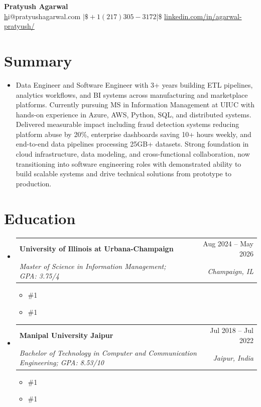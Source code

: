 \documentclass[letterpaper,11pt]{article}
\makeatletter
\newcommand{\resumeSubheading}[4]{
  \vspace{0pt}\item
    \begin{tabular*}{\textwidth}{l@{\extracolsep{\fill}}r}
      \textbf{#1} & #2 \\
      \textit{#3} & \textit{#4} \\ 
    \end{tabular*}\vspace{-6pt}
}
\newcommand{\resumeEducationCoursework}[1]{
  \vspace{-9pt} 
  \begin{itemize}[leftmargin=0pt, label={}]
    \item {\#1}
  \end{itemize}
}
\newcommand{\resumeEducationCertifications}[1]{
  \vspace{-15pt} 
  \begin{itemize}[leftmargin=0pt, label={}]
    \item {\#1}
  \end{itemize}
}
\newcommand{\resumeSubHeadingListStart}{\begin{itemize}[leftmargin=0pt,label={},itemsep=-2pt]}
\newcommand{\resumeSubHeadingListEnd}{\end{itemize}}
\makeatother
\begin{document}
\justifying

\begin{center}
    \textbf{\LARGE Pratyush Agarwal} \\ \vspace{5pt}
    \href{mailto:hi@pratyushagarwal.com}hi@pratyushagarwal.com $|\$ +1 (217) 305-3172 $|\$ \href{%
      https://linkedin.com/in/agarwal-pratyush/%
    }{%
      linkedin.com/in/agarwal-pratyush/%
    }
\end{center}

\section{Summary}
\begin{itemize}[leftmargin=0pt, label={}]
  \item { Data Engineer and Software Engineer with 3+ years building ETL pipelines, analytics workflows, and BI systems across manufacturing and marketplace platforms. Currently pursuing MS in Information Management at UIUC with hands-on experience in Azure, AWS, Python, SQL, and distributed systems. Delivered measurable impact including fraud detection systems reducing platform abuse by 20\%, enterprise dashboards saving 10+ hours weekly, and end-to-end data pipelines processing 25GB+ datasets. Strong foundation in cloud infrastructure, data modeling, and cross-functional collaboration, now transitioning into software engineering roles with demonstrated ability to build scalable systems and drive technical solutions from prototype to production. }
\end{itemize}

\section{Education}
  \resumeSubHeadingListStart
    \resumeSubheading
      {University of Illinois at Urbana-Champaign}{Aug 2024 -- May 2026}
      {Master of Science in Information Management; GPA: 3.75/4}{Champaign, IL}
      \resumeEducationCoursework{\textbf{Relevant Coursework:} Applied Machine Learning, Cloud Computing Applications, Data Mining, Data Warehousing and Business Intelligence, Information Modeling, Data Visualization, Data and Statistical Models}
      \resumeEducationCertifications{\textbf{Certifications:} Getting Started with Microsoft Azure, Cloud Computing, The Complete Prompt Engineering for AI Bootcamp}
    \resumeSubheading
      {Manipal University Jaipur}{Jul 2018 -- Jul 2022}
      {Bachelor of Technology in Computer and Communication Engineering; GPA: 8.53/10}{Jaipur, India}
      \resumeEducationCoursework{\textbf{Relevant Coursework:} Data Structures and Algorithms, Relational Database Management Systems, Operating Systems, Computer Networks, Software Testing, Cryptography and Security}
      \resumeEducationCertifications{\textbf{Certifications:} Certified Ethical Hacker (EC Council), Google Project Management Specialization, Networking in Google Cloud, Architecting with Google Kubernetes Engine, Web Application Security Testing with Burp Suite}
  \resumeSubHeadingListEnd
\end{document}
